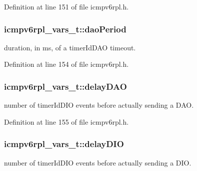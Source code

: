 Definition at line 151 of file icmpv6rpl.\+h.

\subsubsection[{\texorpdfstring{dao\+Period}{daoPeriod}}]{ icmpv6rpl\+\_\+vars\+\_\+t\+::dao\+Period}\hypertarget{structicmpv6rpl__vars__t_a91b6d595a19065508d23ef188daf47f3}{}\label{structicmpv6rpl__vars__t_a91b6d595a19065508d23ef188daf47f3}


duration, in ms, of a timer\+Id\+D\+AO timeout. 



Definition at line 154 of file icmpv6rpl.\+h.

\subsubsection[{\texorpdfstring{delay\+D\+AO}{delayDAO}}]{ icmpv6rpl\+\_\+vars\+\_\+t\+::delay\+D\+AO}\hypertarget{structicmpv6rpl__vars__t_af7f9f1a6d63edad786ec52a23a1c13e3}{}\label{structicmpv6rpl__vars__t_af7f9f1a6d63edad786ec52a23a1c13e3}


number of timer\+Id\+D\+IO events before actually sending a D\+AO. 



Definition at line 155 of file icmpv6rpl.\+h.

\subsubsection[{\texorpdfstring{delay\+D\+IO}{delayDIO}}]{ icmpv6rpl\+\_\+vars\+\_\+t\+::delay\+D\+IO}\hypertarget{structicmpv6rpl__vars__t_a9a63bf76729ecead4336da4d6390961b}{}\label{structicmpv6rpl__vars__t_a9a63bf76729ecead4336da4d6390961b}


number of timer\+Id\+D\+IO events before actually sending a D\+IO. 



